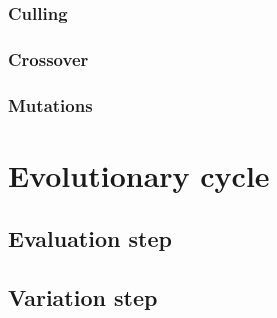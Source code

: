 \documentclass[main]{subfiles}
\begin{document}
\subsubsection{Culling}
\label{subsubsection:Culling}

\lipsum[14]

\subsubsection{Crossover}

\lipsum[14]

\subsubsection{Mutations}

\lipsum[15]

\section{Evolutionary cycle}

\lipsum[16]

\subsection{Evaluation step}

\lipsum[17]

\subsection{Variation step}

\lipsum[18]

\end{document}
